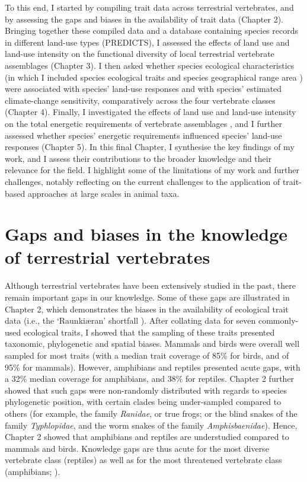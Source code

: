 To this end, I started by compiling trait data across terrestrial vertebrates, and by assessing the gaps and biases in the availability of trait data (Chapter 2). Bringing together these compiled data and a database containing species records in different land-use types (PREDICTS), I assessed the effects of land use and land-use intensity on the functional diversity of local terrestrial vertebrate assemblages (Chapter 3). I then asked whether species ecological characteristics (in which I included species ecological traits and species geographical range area ) were associated with species' land-use responses and with species' estimated climate-change sensitivity, comparatively across the four vertebrate classes (Chapter 4). Finally, I investigated the effects of land use and land-use intensity on the total energetic requirements of vertebrate assemblages , and I further assessed whether species' energetic requirements influenced species' land-use responses (Chapter 5). In this final Chapter, I synthesise the key findings of my work, and I assess their contributions to the broader knowledge and their relevance for the field. I highlight some of the limitations of my work and further challenges, notably reflecting on the current challenges to the application of trait-based approaches at large scales in animal taxa. 

\section{Gaps and biases in the knowledge of terrestrial vertebrates}

Although terrestrial vertebrates have been extensively studied in the past, there remain important gaps in our knowledge. Some of these gaps are illustrated in Chapter 2, which demonstrates the biases in the availability of ecological trait data (i.e., the ‘Raunki{\ae}ran’ shortfall \citep{Hortal2015}). After collating data for seven commonly-used ecological traits, I showed that the sampling of these traits  presented taxonomic, phylogenetic and spatial biases. Mammals and birds were overall well sampled for most traits (with a median trait coverage of 85\% for birds, and of 95\% for mammals). However, amphibians and reptiles presented acute gaps, with a 32\% median coverage for amphibians, and 38\% for reptiles. Chapter 2 further showed that such gaps were non-randomly distributed with regards to species phylogenetic position, with certain clades being under-sampled compared to others (for example, the family \textit{Ranidae}, or true frogs; or the blind snakes of the family \textit{Typhlopidae}, and the  worm snakes of the family \textit{Amphisbaenidae}). Hence, Chapter 2 showed that amphibians and reptiles are understudied compared to mammals and birds. Knowledge gaps are thus acute for the most diverse vertebrate class (reptiles) as well as for the most threatened vertebrate class (amphibians; \citet{IUCN2020}).
 
